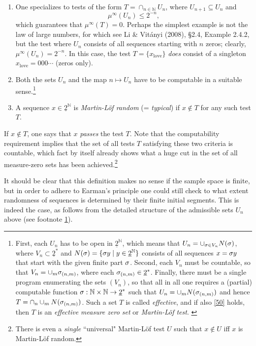 \documentclass[11pt,a4paper]{article}
\numberwithin{equation}{section}
\newcommand{\er}{\eqref}
\newcommand{\beq}{\begin{equation}}
\newcommand{\eeq}{\end{equation}}
\newcommand{\ul}{\underline}
\newcommand{\raw}{\rightarrow}
\newcommand{\x}{\times}
\newcommand{\N}{{\mathbb N}} \newcommand{\R}{{\mathbb R}}
\begin{document}
 \begin{enumerate}
\item 
 One specializes to tests of the form $T=\cap_{n\in\N} U_n$, where $U_{n+1}\subseteq U_n$ and 
 \beq
 \mu^{\infty}(U_n)\leq 2^{-n}, \label{50}
 \eeq 
 which guarantees that $\mu^{\infty}(T)=0$. 
Perhaps the simplest example is not the law of large numbers, for which see Li \& Vit\'{a}nyi (2008), \S 2.4, Example 2.4.2, but the test where $U_n$ consists of all sequences starting with $n$ zeros; clearly, $ \mu^{\infty}(U_n)= 2^{-n}$. In this case, the  test $T=\{x_{\mathrm{love}}\}$ \emph{does} consist of a singleton $x_{\mathrm{love}}=000\cdots$ (zeros only).
\item Both the sets $U_n$ and the map $n\mapsto U_n$ have to be computable in a suitable sense.\footnote{\label{Un}First, each $U_n$ has to be open in $\ul{2}^{\N}$, which means that  $U_n=\cup_{\sigma\in V_n} N(\sigma)$, where $V_n\subset \ul{2}^*$
and $N(\sg)=\{\sg y\mid y\in \ul{2}^{\N}\}$ consists of all sequences $x=\sigma y$ that start with the given finite part $\sigma$. Second, 
each $V_n$ must be countable, so that $V_n=\cup_m \sigma_{(n,m)}$, where each $\sg_{(n,m)}\in \ul{2}^*$. Finally, 
there must be a single program enumerating the sets $(V_n)$, so that all in all one requires a (partial) computable function $\sg:\N\x\N\raw \ul{2}^*$ such that $U_n=\cup_m N(\sigma_{(n,m)})$ and hence $T=\cap_n\cup_m N(\sigma_{(n,m)})$. Such a set $T$ is called \emph{effective}, and if also \er{50} holds, then $T$ is an \emph{effective measure zero set} or \emph{Martin-L\"{o}f test}.  \label{effective}
}
\item A sequence $x\in \ul{2}^{\N}$ is  \emph{Martin-L\"{o}f random} (= \emph{typical})  if $x\notin T$ for any such test $T$.
\end{enumerate}
If $x\notin T$, one says that $x$ \emph{passes} the test $T$. Note that the computability requirement  implies that  the set of all tests $T$ satisfying these two criteria is countable, which fact by itself already shows what a huge cut in the set of all measure-zero sets has been achieved.\footnote{There is even a \emph{single} ``universal" Martin-L\"{o}f test $U$ such that $x\notin U$ iff $x$ is Martin-L\"{o}f random.}

It should be clear that this definition makes no sense if the sample space is finite, but in order to adhere to Earman's principle one could still check to what extent randomness of sequences is determined by their finite initial segments. This is indeed the case, as follows from the detailed structure of the admissible sets $U_n$ above (see footnote \ref{Un}).
\end{document}
